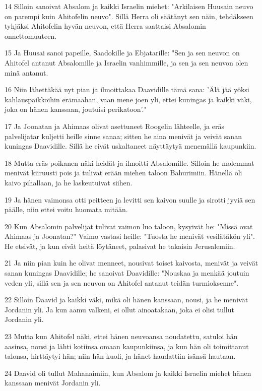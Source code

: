 \par 14 Silloin sanoivat Absalom ja kaikki Israelin miehet: "Arkilaisen Huusain neuvo on parempi kuin Ahitofelin neuvo". Sillä Herra oli säätänyt sen näin, tehdäkseen tyhjäksi Ahitofelin hyvän neuvon, että Herra saattaisi Absalomin onnettomuuteen.
\par 15 Ja Huusai sanoi papeille, Saadokille ja Ebjatarille: "Sen ja sen neuvon on Ahitofel antanut Absalomille ja Israelin vanhimmille, ja sen ja sen neuvon olen minä antanut.
\par 16 Niin lähettäkää nyt pian ja ilmoittakaa Daavidille tämä sana: 'Älä jää yöksi kahlauspaikkoihin erämaahan, vaan mene joen yli, ettei kuningas ja kaikki väki, joka on hänen kanssaan, joutuisi perikatoon'."
\par 17 Ja Joonatan ja Ahimaas olivat asettuneet Roogelin lähteelle, ja eräs palvelijatar kuljetti heille sinne sanaa; sitten he aina menivät ja veivät sanan kuningas Daavidille. Sillä he eivät uskaltaneet näyttäytyä menemällä kaupunkiin.
\par 18 Mutta eräs poikanen näki heidät ja ilmoitti Absalomille. Silloin he molemmat menivät kiiruusti pois ja tulivat erään miehen taloon Bahurimiin. Hänellä oli kaivo pihallaan, ja he laskeutuivat siihen.
\par 19 Ja hänen vaimonsa otti peitteen ja levitti sen kaivon suulle ja sirotti jyviä sen päälle, niin ettei voitu huomata mitään.
\par 20 Kun Absalomin palvelijat tulivat vaimon luo taloon, kysyivät he: "Missä ovat Ahimaas ja Joonatan?" Vaimo vastasi heille: "Tuosta he menivät vesilätäkön yli". He etsivät, ja kun eivät heitä löytäneet, palasivat he takaisin Jerusalemiin.
\par 21 Ja niin pian kuin he olivat menneet, nousivat toiset kaivosta, menivät ja veivät sanan kuningas Daavidille; he sanoivat Daavidille: "Nouskaa ja menkää joutuin veden yli, sillä sen ja sen neuvon on Ahitofel antanut teidän turmioksenne".
\par 22 Silloin Daavid ja kaikki väki, mikä oli hänen kanssaan, nousi, ja he menivät Jordanin yli. Ja kun aamu valkeni, ei ollut ainoatakaan, joka ei olisi tullut Jordanin yli.
\par 23 Mutta kun Ahitofel näki, ettei hänen neuvoansa noudatettu, satuloi hän aasinsa, nousi ja lähti kotiinsa omaan kaupunkiinsa, ja kun hän oli toimittanut talonsa, hirttäytyi hän; niin hän kuoli, ja hänet haudattiin isänsä hautaan.
\par 24 Daavid oli tullut Mahanaimiin, kun Absalom ja kaikki Israelin miehet hänen kanssaan menivät Jordanin yli.
